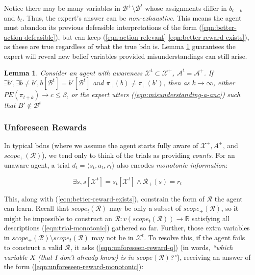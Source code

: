 \documentclass{article}
\newcommand{\bdn}{{\sc bdn}}
\newtheorem{lemma}{Lemma}
\begin{document}
		Notice there may be many variables in $\mathcal{B}^+ \setminus \mathcal{B}^t$ whose assignments differ in $b_{t-k}$ and $b_t$. Thus, the expert's answer can be \emph{non-exhaustive}. This means the agent must abandon its previous defeasible interpretations of the form (\ref{eqn:better-action-defeasible}), but can keep (\ref{eqn:action-relevant}-\ref{eqn:better-reward-exists}), as these are true regardless of what the true \bdn{} is. Lemma \ref{theorem:state-space-awareness} guarantees the expert will reveal new belief variables provided misunderstandings can still arise.
		
		\begin{lemma}
			\label{theorem:state-space-awareness}
			Consider an agent with awareness $\mathcal{X}^t \subset \mathcal{X}^+$, $\mathcal{A}^t = \mathcal{A}^+$. If $\exists b', \exists b \neq b', b[\mathcal{B}^t] = b'[\mathcal{B}^t]$ and $\pi_+(b) \neq \pi_+(b')$, then as $k \rightarrow \infty$, either $PE(\pi_{t+k}) \rightarrow c \leq \beta$, or the expert utters (\ref{eqn:misunderstanding-a-anc}) such that $B' \notin \mathcal{B}^t$
		\end{lemma}
	\subsubsection{Unforeseen Rewards}
	
	In typical \bdn{}s (where we assume the agent starts fully aware of $\mathcal{X}^+, A^+$, and $scope_+(\mathcal{R})$), we tend only to think of the trials as providing \emph{counts}. For an unaware agent, a trial $d_t = \langle s_t, a_t, r_t \rangle$ also encodes \emph{monotonic information}:
	
	\begin{equation}
	\label{eqn:trial-monotonic}
	\exists s, s[\mathcal{X}^t] = s_{t}[\mathcal{X}^t] \wedge \mathcal{R}_+(s) = r_{t}
	\end{equation}
	
	This, along with (\ref{eqn:better-reward-exists}), constrain the form of $\mathcal{R}$ the agent can learn. Recall that $scope_t(\mathcal{R})$ may be only a subset of $scope_+(\mathcal{R})$, so it might be impossible to construct an $\mathcal{R} : v(scope_t(\mathcal{R})) \rightarrow \mathds{R}$ satisfying all descriptions (\ref{eqn:trial-monotonic}) gathered so far. Further, those extra variables in $scope_+(\mathcal{R}) \setminus scope_t(\mathcal{R})$ may not be in $\mathcal{X}^t$. To resolve this, if the agent fails to construct a valid $\mathcal{R}$, it asks (\ref{eqn:unforeseen-reward-q}) (in words, \emph{``which variable $X$ (that I don't already know) is in $scope(\mathcal{R})$?''}), receiving an answer of the form (\ref{eqn:unforeseen-reward-monotonic}):
	
\end{document}
